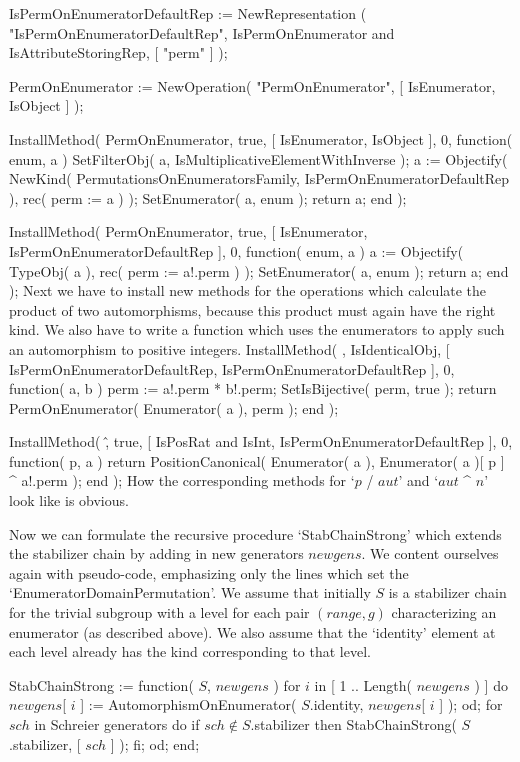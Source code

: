 \begintt
IsPermOnEnumeratorDefaultRep := NewRepresentation
    ( "IsPermOnEnumeratorDefaultRep",
      IsPermOnEnumerator and IsAttributeStoringRep,
      [ "perm" ] );

PermOnEnumerator := NewOperation( "PermOnEnumerator",
    [ IsEnumerator, IsObject ] );
\endtt

\begintt
InstallMethod( PermOnEnumerator, true,
        [ IsEnumerator, IsObject ], 0,
    function( enum, a )
    SetFilterObj( a, IsMultiplicativeElementWithInverse );
    a := Objectify( NewKind( PermutationsOnEnumeratorsFamily,
                 IsPermOnEnumeratorDefaultRep ),
                 rec( perm := a ) );
    SetEnumerator( a, enum );
    return a;
end );
\endtt

\begintt
InstallMethod( PermOnEnumerator, true,
        [ IsEnumerator, IsPermOnEnumeratorDefaultRep ], 0,
    function( enum, a )
    a := Objectify( TypeObj( a ), rec( perm := a!.perm ) );
    SetEnumerator( a, enum );
    return a;
end );
\endtt
Next we  have to install new  methods for the  operations which calculate
the  product of two automorphisms, because   this product must again have
the    right kind. We    also have to write  a    function which uses the
enumerators to apply such an automorphism to positive integers.
\begintt
InstallMethod( \*, IsIdenticalObj,
        [ IsPermOnEnumeratorDefaultRep, IsPermOnEnumeratorDefaultRep ], 0,
    function( a, b )
    perm := a!.perm * b!.perm;
    SetIsBijective( perm, true );
    return PermOnEnumerator( Enumerator( a ), perm );
end );
\endtt

\begintt
InstallMethod( \^, true,
        [ IsPosRat and IsInt, IsPermOnEnumeratorDefaultRep ], 0,
    function( p, a )
    return PositionCanonical( Enumerator( a ),
                   Enumerator( a )[ p ] ^ a!.perm );
end );
\endtt
How the corresponding  methods for `$p$ /  $aut$' and `$aut$  ^ $n$' look
like is obvious.

Now we  can  formulate  the recursive procedure   `StabChainStrong' which
extends  the stabilizer chain by adding  in new  generators $newgens$. We
content  ourselves again   with pseudo-code, emphasizing  only  the lines
which set the `EnumeratorDomainPermutation'. We assume that initially $S$
is a stabilizer chain for the trivial subgroup with a level for each pair
$(range,g)$ characterizing an enumerator  (as  described above). We  also
assume that  the `identity'  element at each  level already  has the kind
corresponding to that level.

\)StabChainStrong := function( $S$, $newgens$ )
\)\quad for $i$  in [ 1 .. Length( $newgens$ ) ]  do
\)\qquad $newgens$[ $i$ ] := AutomorphismOnEnumerator( $S$.identity, %
         $newgens$[ $i$ ] );
\)\quad od;
\)
\)\quad for $sch$  in {\rm Schreier generators}  do
\)\qquad if $sch \notin S$.stabilizer  then
\)\qquad\quad StabChainStrong( $S$.stabilizer, [ $sch$ ] );
\)\qquad fi;
\)\quad od;
\)end;

